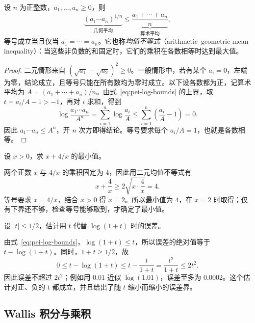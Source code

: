 \begin{theorem}[算术平均与几何平均不等式]
\label{thm:pei-amgm}
设 $n$ 为正整数，$a_1,\ldots,a_n\ge0$，则
\begin{equation}
    \underbrace{(a_1\cdots a_n)^{1/n}}_{\text{几何平均}}
    \le\underbrace{\frac{a_1+\cdots+a_n}{n}}_{\text{算术平均}},
    \label{eq:pei-amgm}
\end{equation}
等号成立当且仅当 $a_1=\cdots=a_n$。它也称\emph{均值不等式}（arithmetic--geometric mean inequality）：当这些非负数的和固定时，它们的乘积在各数相等时达到最大值。
\end{theorem}
\begin{proof}
二元情形来自 $(\sqrt{a_1}-\sqrt{a_2})^2\ge0$。一般情形中，若有某个 $a_i=0$，左端为零，结论成立，且等号只能在所有数均为零时成立。以下设各数都为正，记算术平均为 $A=(a_1+\cdots+a_n)/n$。由式~\eqref{eq:pei-log-bounds} 的上界，取 $t=a_i/A-1>-1$，再对 $i$ 求和，得到
\[
    \log\frac{a_1\cdots a_n}{A^n}
    =\sum_{i=1}^n\log\frac{a_i}{A}
    \le\sum_{i=1}^n\left(\frac{a_i}{A}-1\right)=0.
\]
因此 $a_1\cdots a_n\le A^n$，开 $n$ 次方即得结论。等号要求每个 $a_i/A=1$，也就是各数相等。
\end{proof}

\begin{example}
\label{ex:pei-amgm-minimum}
设 $x>0$，求 $x+4/x$ 的最小值。
\end{example}
\begin{solve}
两个正数 $x$ 与 $4/x$ 的乘积固定为 $4$，因此用二元均值不等式有
\[
    x+\frac4x\ge2\sqrt{x\cdot\frac4x}=4.
\]
等号要求 $x=4/x$，结合 $x>0$ 得 $x=2$。所以最小值为 $4$，在 $x=2$ 时取得；仅有下界还不够，检查等号能够取到，才确定了最小值。
\end{solve}

\begin{example}
\label{ex:pei-log-approximation-error}
设 $|t|\le1/2$，估计用 $t$ 代替 $\log(1+t)$ 时的误差。
\end{example}
\begin{solve}
由式~\eqref{eq:pei-log-bounds}，$\log(1+t)\le t$，所以误差的绝对值等于 $t-\log(1+t)$。同时，$1+t\ge1/2$，故
\[
    0\le t-\log(1+t)
    \le t-\frac{t}{1+t}
    =\frac{t^2}{1+t}\le2t^2.
\]
因此误差不超过 $2t^2$；例如用 $0.01$ 近似 $\log(1.01)$，误差至多为 $0.0002$。这个估计对正、负的 $t$ 都成立，并且给出了随 $t$ 缩小而缩小的误差界。
\end{solve}

\subsection{Wallis 积分与乘积}

